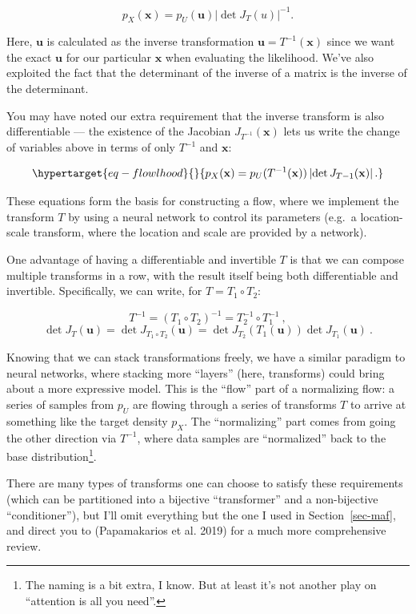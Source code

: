 \documentclass[
  11pt,
  numbers=noendperiod]{book}
\begin{document}
\[
p_X(\mathbf{x}) = p_U(\mathbf{u}) \left|\det{J_T(u)} \right|^{-1}.
\]

Here, \(\mathbf{u}\) is calculated as the inverse transformation
\(\mathbf{u} = T^{-1}(\mathbf{x})\) since we want the exact
\(\mathbf{u}\) for our particular \(\mathbf{x}\) when evaluating the
likelihood. We've also exploited the fact that the determinant of the
inverse of a matrix is the inverse of the determinant.

You may have noted our extra requirement that the inverse transform is
also differentiable --- the existence of the Jacobian
\(J_{T^{-1}}(\mathbf{x})\) lets us write the change of variables above
in terms of only \(T^{-1}\) and \(\mathbf{x}\):

\begin{equation}\protect\hypertarget{eq-flowlhood}{}{
p_X(\mathbf{x}) = p_U(T^{-1}(\mathbf{x})) \left|\det{J_{T{-1}}(\mathbf{x})} \right|.
}\label{eq-flowlhood}\end{equation}

These equations form the basis for constructing a flow, where we
implement the transform \(T\) by using a neural network to control its
parameters (e.g.~a location-scale transform, where the location and
scale are provided by a network).

One advantage of having a differentiable and invertible \(T\) is that we
can compose multiple transforms in a row, with the result itself being
both differentiable and invertible. Specifically, we can write, for
\(T=T_1 \circ T_2\):

\[
T^{-1} = (T_1 \circ T_2)^{-1} = T_2^{-1} \circ T_1^{-1}~,
\] \[
\det{J_T(\mathbf{u})} = \det{J_{T_1 \circ T_2}(\mathbf{u})} = \det{J_{T_2}(T_1(\mathbf{u}))}\det{J_{T_1}(\mathbf{u})}~.
\]

Knowing that we can stack transformations freely, we have a similar
paradigm to neural networks, where stacking more ``layers'' (here,
transforms) could bring about a more expressive model. This is the
``flow'' part of a normalizing flow: a series of samples from \(p_U\)
are flowing through a series of transforms \(T\) to arrive at something
like the target density \(p_X\). The ``normalizing'' part comes from
going the other direction via \(T^{-1}\), where data samples are
``normalized'' back to the base distribution\footnote{The naming is a
  bit extra, I know. But at least it's not another play on ``attention
  is all you need''.}.

There are many types of transforms one can choose to satisfy these
requirements (which can be partitioned into a bijective ``transformer''
and a non-bijective ``conditioner''), but I'll omit everything but the
one I used in Section~\ref{sec-maf}, and direct you to (Papamakarios et
al. 2019) for a much more comprehensive review.
\end{document}
